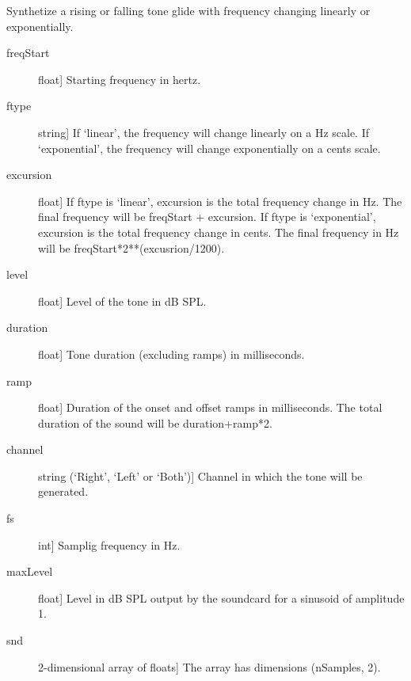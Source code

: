 \documentclass[letterpaper,10pt,english]{sphinxmanual}
\begin{document}
\begin{fulllineitems}
\label{index:sndlib.glide}
Synthetize a rising or falling tone glide with frequency changing
linearly or exponentially.
\begin{description}
\item[{freqStart}] \leavevmode{[}float{]}
Starting frequency in hertz.

\item[{ftype}] \leavevmode{[}string{]}
If `linear', the frequency will change linearly on a Hz scale.
If `exponential', the frequency will change exponentially on a cents scale.

\item[{excursion}] \leavevmode{[}float{]}
If ftype is `linear', excursion is the total frequency change in Hz.
The final frequency will be freqStart + excursion.
If ftype is `exponential', excursion is the total frequency change in cents.
The final frequency in Hz will be freqStart*2**(excusrion/1200).

\item[{level}] \leavevmode{[}float{]}
Level of the tone in dB SPL.

\item[{duration}] \leavevmode{[}float{]}
Tone duration (excluding ramps) in milliseconds.

\item[{ramp}] \leavevmode{[}float{]}
Duration of the onset and offset ramps in milliseconds.
The total duration of the sound will be duration+ramp*2.

\item[{channel}] \leavevmode{[}string (`Right', `Left' or `Both'){]}
Channel in which the tone will be generated.

\item[{fs}] \leavevmode{[}int{]}
Samplig frequency in Hz.

\item[{maxLevel}] \leavevmode{[}float{]}
Level in dB SPL output by the soundcard for a sinusoid of amplitude 1.

\end{description}
\begin{description}
\item[{snd}] \leavevmode{[}2-dimensional array of floats{]}
The array has dimensions (nSamples, 2).


\end{description}
\end{fulllineitems}
\end{document}

